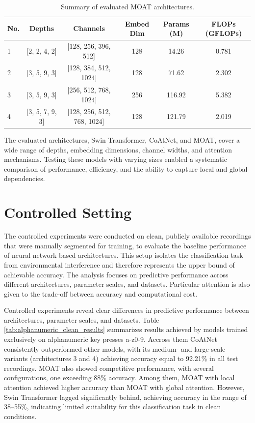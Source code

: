 \documentclass[a4paper,11pt,twoside]{report}
\theoremstyle{definition}
\begin{document}
\begin{table}[h!]
\centering
\caption{Summary of evaluated MOAT architectures.}
\begin{adjustbox}{max width=\textwidth}
\begin{tabular}{lccccc}
\hline
\textbf{No.} & \textbf{Depths} & \textbf{Channels} & \textbf{Embed Dim} & \textbf{Params (M)} & \textbf{FLOPs (GFLOPs)} \\
\hline
1 & [2, 2, 4, 2] & [128, 256, 396, 512] & 128 & 14.26 & 0.781 \\
2 & [3, 5, 9, 3] & [128, 384, 512, 1024] & 128 & 71.62 & 2.302 \\
3 & [3, 5, 9, 3] & [256, 512, 768, 1024] & 256 & 116.92 & 5.382 \\
4 & [3, 5, 7, 9, 3] & [128, 256, 512, 768, 1024] & 128 & 121.79 & 2.019 \\
\hline
\end{tabular}
\end{adjustbox}
\label{tab:MOAT_architectures}
\end{table}

The evaluated architectures, Swin Transformer, CoAtNet, and MOAT, cover a wide range of depths, embedding dimensions, channel widths, and attention mechanisms. Testing these models with varying sizes enabled a systematic comparison of performance, efficiency, and the ability to capture local and global dependencies.

\section{Controlled Setting}

The controlled experiments were conducted on clean, publicly available recordings that were manually segmented for training, to evaluate the baseline performance of neural-network based architectures. This setup isolates the classification task from environmental interference and therefore represents the upper bound of achievable accuracy. The analysis focuses on predictive performance across different architectures, parameter scales, and datasets. Particular attention is also given to the trade-off between accuracy and computational cost.

Controlled experiments reveal clear differences in predictive performance between architectures, parameter scales, and datasets. Table \ref{tab:alphanumeric_clean_results} summarizes results achieved by models trained exclusively on alphanumeric key presses a-z0-9. Accross them CoAtNet consistently outperformed other models, with its medium- and large-scale variants (architectures 3 and 4) achieving accuracy equal to 92.21\% in all test recordings. MOAT also showed competitive performance, with several configurations, one exceeding 88\% accuracy. Among them, MOAT with local attention achieved higher accuracy than MOAT with global attention. However, Swin Transformer lagged significantly behind, achieving accuracy in the range of 38–55\%, indicating limited suitability for this classification task in clean conditions.
\end{document}

